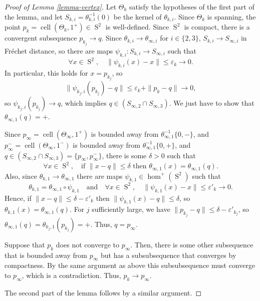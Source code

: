 \documentclass[JEP,XML,SOM,Unicode,NoFloatCountersInSection,published]{cedram}
\newcommand{\quand}{\quad\text{and}\quad}
\theoremstyle{remark}
\let\eps\varepsilon
\DeclareMathOperator{\sphere}{S}
\DeclareMathOperator{\cell}{cell}
\begin{document}
\begin{proof}[Proof of Lemma \ref{lemma-vertex}]
Let $\Theta_k$ satisfy the hypotheses of the first part of the lemma, and let $S_{k,i} = \theta_{k,i}^{-1}(0)$ be the kernel of $\theta_{k,i}$.
Since $\Theta_k$ is spanning, the point $p_k = \cell(\Theta_k,1^+) \in \sphere^2$ is well-defined.
Since $\sphere^2$ is compact, there is a convergent subsequence $p_{k_j} \to q$.
Since $\theta_{k,i} \to \theta_{\infty,i}$ for $i \in \{2,3\}$, $S_{k,i} \to S_{\infty,i}$ in Fréchet distance, so there are maps $\psi_{k,i}:S_{k,i} \to S_{\infty,i}$ such that
\[
\forall x \in \sphere^2,\quad \|\psi_{k,i}(x)-x\| \leq \eps_k \to 0.
\]
In particular, this holds for $x=p_{k_j}$, so
\[
\| \psi_{k_j,i}(p_{k_j}) -q\| \leq \eps_k + \|p_k -q\| \to 0,
\]
so $\psi_{k_j,i}(p_{k_j}) \to q$, which implies $q \in (S_{\infty,2} \cap S_{\infty,3})$.
We just have to show that $\theta_{\infty,1}(q)=+$.

Since $p_\infty = \cell(\Theta_\infty,1^+)$ is bounded away from $\theta_{\infty,1}^{-1}\{0,-\}$, and $p^-_\infty = \cell(\Theta_\infty,1^-)$ is bounded away from $\theta_{\infty,1}^{-1}\{0,+\}$, and $q \in (S_{\infty,2} \cap S_{\infty,3}) = \{p_\infty,p^-_\infty\}$, there is some $\delta > 0$ such that
\[
\forall x \in \sphere^2,\quad\text{if }\|x-q\| \leq \delta\text{ then }\theta_{\infty,1}(x) = \theta_{\infty,1}(q).
\]
Also, since $\theta_{k,1} \to \theta_{\infty,1}$ there are maps $\psi_{k,1} \in \hom^+(\sphere^2)$ such that
\[
\theta_{k,1} = \theta_{\infty,1} \circ \psi_{k,1}\quand\forall x \in \sphere^2,\quad \|\psi_{k,1}(x) -x\| \leq \eps'_k \to 0.
\]
Hence, if $\|x-q\| \leq \delta -\eps'_k$ then $\|\psi_{k,1}(x)-q\| \leq \delta$, so $\theta_{k,1}(x) = \theta_{\infty,1}(q)$.
For $j$ sufficiently large, we have $\|p_{k_j} -q\| \leq \delta -\eps'_{k_j}$, so $\theta_{\infty,1}(q) = \theta_{k_j,1}(p_{k_j}) = +$. Thus, $q = p_\infty$.

Suppose that $p_k$ does not converge to $p_\infty$. Then, there is some other subsequence that is bounded away from $p_\infty$ but has a subsubsequence that converges by compactness. By the same argument as above this subsubsequence must converge to $p_\infty$, which is a contradiction. Thus, $p_k \to p_\infty$.

The second part of the lemma follows by a similar argument.
\end{proof}
\end{document}
